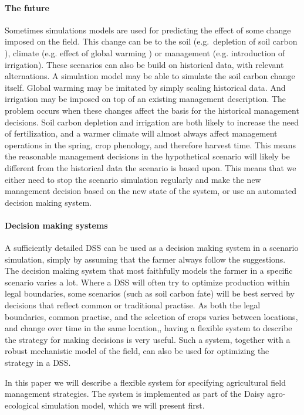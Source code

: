 \documentclass[a4paper]{article}
\begin{document}
\paragraph{The future} Sometimes simulations models are used for
predicting the effect of some change imposed on the field.  This
change can be to the soil (e.g.\ depletion of soil carbon
\cite{daisy-somnew}), climate (e.g. effect of global warming
\cite{climate}) or management (e.g.  introduction of irrigation).
These scenarios can also be build on historical data, with relevant
alternations.  A simulation model may be able to simulate the soil
carbon change itself.  Global warming may be imitated by simply
scaling historical data.  And irrigation may be imposed on top of an
existing management description.  The problem occurs when these
changes affect the basis for the historical management decisions.
Soil carbon depletion and irrigation are both likely to increase the
need of fertilization, and a warmer climate will almost always affect
management operations in the spring, crop phenology, and therefore
harvest time.  This means the reasonable management decisions in the
hypothetical scenario will likely be different from the historical
data the scenario is based upon.  This means that we either need to
stop the scenario simulation regularly and make the new management
decision based on the new state of the system, or use an automated
decision making system.

\paragraph{Decision making systems} A sufficiently detailed DSS can be
used as a decision making system in a scenario simulation, simply by
assuming that the farmer always follow the suggestions.  The decision
making system that most faithfully models the farmer in a specific
scenario varies a lot.  Where a DSS will often try to optimize
production within legal boundaries, some scenarios (such as soil
carbon fate) will be best served by decisions that reflect common or
traditional practise.  As both the legal boundaries, common practise,
and the selection of crops varies between locations, and change over
time in the same location,, having a flexible system to describe the
strategy for making decisions is very useful.  Such a system, together
with a robust mechanistic model of the field, can also be used for
optimizing the strategy in a DSS.

In this paper we will describe a flexible system for specifying
agricultural field management strategies.  The system is implemented
as part of the Daisy agro-ecological simulation model, which we will
present first.
\end{document}
